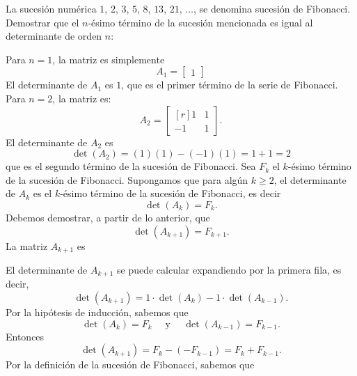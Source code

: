 \begin{examplebox}{}{}
    La sucesión numérica $1$, $2$, $3$, $5$, $8$, $13$, $21$, $\dots$, se denomina sucesión de Fibonacci. Demostrar que el $n$-ésimo término de la sucesión mencionada es igual al determinante de orden $n$:
    \begin{matrizn}
    \end{matrizn}

    \tcblower
    \demostracion Para $n = 1$, la matriz es simplemente
    $$A_1 = \begin{bmatrix} 1 \end{bmatrix}$$
    El determinante de $A_1$ es $1$, que es el primer término de la serie de Fibonacci.
    Para $n = 2$, la matriz es:
    $$A_2 = \begin{bmatrix*}[r]
        1 & 1 \\
        -1 & 1
    \end{bmatrix*}.$$
    El determinante de $A_2$ es
    $$\det(A_2) = (1)(1) - (-1)(1) = 1 + 1 = 2$$
    que es el segundo término de la sucesión de Fibonacci. Sea $F_k$ el $k$-ésimo término de la sucesión de Fibonacci. Supongamos que para algún $k \geq 2$, el determinante de $A_k$ es el $k$-ésimo término de la sucesión de Fibonacci, es decir
    $$\det(A_k) = F_k.$$
    Debemos demostrar, a partir de lo anterior, que
    $$\det(A_{k+1}) = F_{k+1}.$$
    La matriz $A_{k+1}$ es
    \begin{matrizn}
    \end{matrizn}
    El determinante de $A_{k+1}$ se puede calcular expandiendo por la primera fila, es decir,
    $$\det(A_{k+1}) = 1 \cdot \det(A_k) - 1 \cdot \det(A_{k-1}).$$
    Por la hipótesis de inducción, sabemos que
    $$\det(A_k) = F_k \quad \text{ y } \quad \det(A_{k-1}) = F_{k-1}.$$
    Entonces
    $$\det(A_{k+1}) = F_k - (-F_{k-1}) = F_k + F_{k-1}.$$
    Por la definición de la sucesión de Fibonacci, sabemos que

\end{examplebox}
